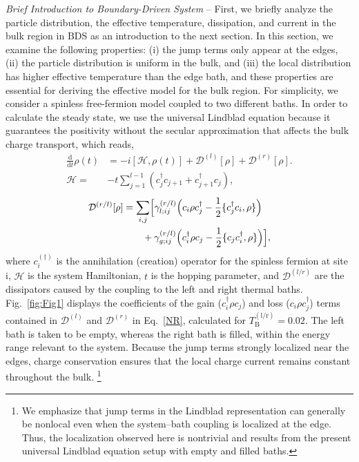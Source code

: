 \documentclass[a4paper, amsfonts, amssymb, amsmath, reprint, showkeys, nofootinbib, twoside,superscriptaddress, prl]{revtex4-2}
\newcommand{\m}[1]{\mathcal{#1}}
\newcommand{\mr}[1]{\mathrm{#1}}
\newcommand{\dt}{\frac{\mathrm{d}}{\mathrm{d}t}}
\begin{document}
{\it{Brief Introduction to Boundary-Driven System}} --
First, we briefly analyze the particle distribution, the effective temperature, dissipation, and current in the bulk region in BDS as an introduction to the next section. In this section, we examine the following properties: (i) the jump terms only appear at the edges, (ii) the particle distribution is uniform in the bulk, and (iii) the local distribution has higher effective temperature than the edge bath, and these properties are essential for deriving the effective model for the bulk region. For simplicity, we consider a spinless free-fermion model coupled to two different baths. In order to calculate the steady state, we use the universal Lindblad equation\cite{Nathan2020-mj,Davidovic2022-zp,Nathan2024-ag,Ikeuchi2025-wd} because it guarantees the positivity without the secular approximation that affects the bulk charge transport\cite{Wichterich2007-mg, Landi2022-gk}, which reads,
\begin{align}
    \dt \rho(t) &= -i[\m{H},\rho(t)] + \m{D}^{(l)}[\rho] + \m{D}^{(r)}[\rho].\label{NR}\\
    \m{H} =& -t\sum_{j=1}^{l-1} (c_j^{\dagger} c_{j+1} + c_{j+1}^{\dagger} c_j),\label{Ham_boundary}
\end{align}
\begin{align}
    \m{D}^{(r/l)}[\rho] &= \sum_{i,j} \Bigl[\gamma^{(r/l)}_{l;ij}\Bigl(c_i \rho c_j^{\dagger} - \frac{1}{2}\{c_j^{\dagger}c_i, \rho\}\Bigr)\nonumber\\
    & \ \ \ \ \ \ +\gamma^{(r/l)}_{g;ij}\Bigl(c_i^{\dagger} \rho c_j - \frac{1}{2}\{c_jc_i^{\dagger}, \rho\}\Bigr)\Bigr],\label{dissipator_boundary}
\end{align}
where $c^{(\dagger)}_{i}$ is the annihilation (creation) operator for the spinless fermion at site i, $\m{H}$ is the system Hamiltonian, $t$ is the hopping parameter, and $\m{D}^{(l/r)}$ are the dissipators caused by the coupling to the left and right thermal baths.
Fig.~\ref{fig:Fig1} displays the coefficients of the gain ($c^\dagger_i \rho c_j$) and loss ($c_i \rho c^\dagger_j$) terms contained in $\m{D}^{(l)}$ and $\m{D}^{(r)}$ in Eq.~\ref{NR}, calculated for $T^{(\mr{l/r})}_{\mr{B}}=0.02$. The left bath is taken to be empty, whereas the right bath is filled, within the energy range relevant to the system. Because the jump terms strongly localized near the edges, charge conservation ensures that the local charge current remains constant throughout the bulk. \footnote{We emphasize that jump terms in the Lindblad representation can generally be nonlocal even when the system--bath coupling is localized at the edge. Thus, the localization observed here is nontrivial and results from the present universal Lindblad equation setup with empty and filled baths.}
\end{document}
